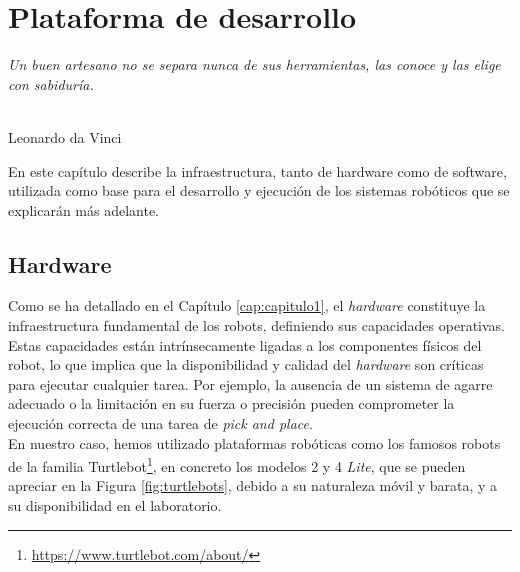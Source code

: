 \chapter{Plataforma de desarrollo}
\label{cap:capitulo3}

\begin{flushright}
\begin{minipage}[]{10cm}
\emph{Un buen artesano no se separa nunca de sus herramientas, las conoce y las elige con sabiduría.}\\
\end{minipage}\\

Leonardo da Vinci\\
\end{flushright}

\vspace{1cm}


En este capítulo describe la infraestructura, tanto de hardware como de
software, utilizada como base para el desarrollo y ejecución de los sistemas
robóticos que se explicarán más adelante.

\section{Hardware}
\label{sec:hardware}

Como se ha detallado en el Capítulo \ref{cap:capitulo1}, el \textit{hardware}
constituye la infraestructura fundamental de los robots, definiendo sus
capacidades operativas.
Estas capacidades están intrínsecamente ligadas a los componentes físicos del
robot, lo que implica que la disponibilidad y calidad del \textit{hardware} son
críticas para ejecutar cualquier tarea.
Por ejemplo, la ausencia de un sistema de agarre adecuado o la limitación en su
fuerza o precisión pueden comprometer la ejecución correcta de una tarea de
\textit{pick and place}.
\\

En nuestro caso, hemos utilizado plataformas robóticas como los famosos robots
de la familia Turtlebot\footnote{\url{https://www.turtlebot.com/about/}}, en
concreto los modelos 2 y 4 \textit{Lite}, que se pueden apreciar en la Figura
\ref{fig:turtlebots}, debido a su naturaleza móvil y barata, y a su
disponibilidad en el laboratorio.
\\

